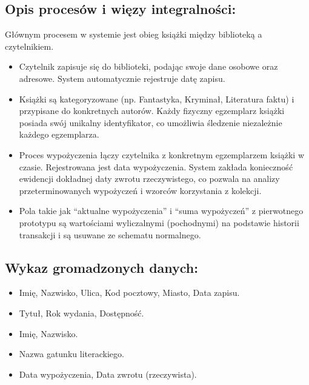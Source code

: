 \documentclass[a4paper,11pt,english,openany,oneside]{sphinxmanual}
\begin{document}
\subsection{Opis procesów i więzy integralności:}
\label{\detokenize{rozdzial_3/index:opis-procesow-i-wiezy-integralnosci}}
\sphinxAtStartPar
Głównym procesem w systemie jest obieg książki między biblioteką a czytelnikiem.
\begin{itemize}
\item {} 
\sphinxAtStartPar
{} Czytelnik zapisuje się do biblioteki, podając swoje dane osobowe oraz adresowe. System automatycznie rejestruje datę zapisu.

\item {} 
\sphinxAtStartPar
{} Książki są kategoryzowane (np. Fantastyka, Kryminał, Literatura faktu) i przypisane do konkretnych autorów. Każdy fizyczny egzemplarz książki posiada swój unikalny identyfikator, co umożliwia śledzenie niezależnie każdego egzemplarza.

\item {} 
\sphinxAtStartPar
{} Proces wypożyczenia łączy czytelnika z konkretnym egzemplarzem książki w czasie. Rejestrowana jest data wypożyczenia. System zakłada konieczność ewidencji dokładnej daty zwrotu rzeczywistego, co pozwala na analizy przeterminowanych wypożyczeń i wzorców korzystania z kolekcji.

\item {} 
\sphinxAtStartPar
{} Pola takie jak “aktualne wypożyczenia” i “suma wypożyczeń” z pierwotnego prototypu są wartościami wyliczalnymi (pochodnymi) na podstawie historii transakcji i są usuwane ze schematu normalnego.

\end{itemize}


\subsection{Wykaz gromadzonych danych:}
\label{\detokenize{rozdzial_3/index:wykaz-gromadzonych-danych}}\begin{itemize}
\item {} 
\sphinxAtStartPar
{} Imię, Nazwisko, Ulica, Kod pocztowy, Miasto, Data zapisu.

\item {} 
\sphinxAtStartPar
{} Tytuł, Rok wydania, Dostępność.

\item {} 
\sphinxAtStartPar
{} Imię, Nazwisko.

\item {} 
\sphinxAtStartPar
{} Nazwa gatunku literackiego.

\item {} 
\sphinxAtStartPar
{} Data wypożyczenia, Data zwrotu (rzeczywista).

\end{itemize}
\end{document}
